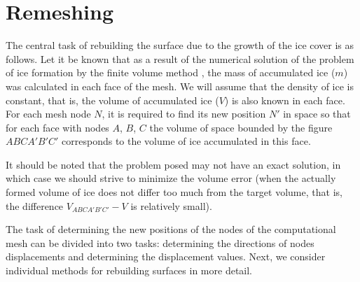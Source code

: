\documentclass[
11pt,%
tightenlines,%
twoside,%
onecolumn,%
nofloats,%
nobibnotes,%
nofootinbib,%
superscriptaddress,%
noshowpacs,%
centertags]%
{revtex4-2}
\begin{document}

\section{Remeshing}

The central task of rebuilding the surface due to the growth of the ice cover is as follows.
Let it be known that as a result of the numerical solution of the problem of ice formation by the finite volume method \cite{Beaugendre}, the mass of accumulated ice ($m$) was calculated in each face of the mesh.
We will assume that the density of ice is constant, that is, the volume of accumulated ice ($V$) is also known in each face.
For each mesh node $N$, it is required to find its new position $N'$ in space so that for each face with nodes $A$, $B$, $C$ the volume of space bounded by the figure $ABCA'B'C'$ corresponds to the volume of ice accumulated in this face.

It should be noted that the problem posed may not have an exact solution, in which case we should strive to minimize the volume error (when the actually formed volume of ice does not differ too much from the target volume, that is, the difference $V_{ABCA'B'C'} - V$ is relatively small).

The task of determining the new positions of the nodes of the computational mesh can be divided into two tasks: determining the directions of nodes displacements and determining the displacement values.
Next, we consider individual methods for rebuilding surfaces in more detail.
\end{document}
